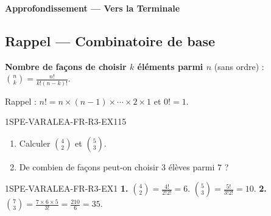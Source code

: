 
\begin{center}\textbf{Approfondissement — Vers la Terminale}\end{center}

\subsection*{Rappel — Combinatoire de base}

\textbf{Nombre de façons de choisir $k$ éléments parmi $n$} (sans ordre) :
$\binom{n}{k} = \frac{n!}{k!(n-k)!}$.

Rappel : $n! = n \times (n-1) \times \cdots \times 2 \times 1$ et $0! = 1$.

\begin{exercice}{1SPE-VARALEA-FR-R3-EX1}{1}{5}
\begin{enumerate}
  \item Calculer $\binom{4}{2}$ et $\binom{5}{3}$.
  \item De combien de façons peut-on choisir $3$ élèves parmi $7$ ?
\end{enumerate}
\end{exercice}


\begin{corrige}{1SPE-VARALEA-FR-R3-EX1}
\textbf{1.} $\binom{4}{2} = \frac{4!}{2!2!} = 6$. $\binom{5}{3} = \frac{5!}{3!2!} = 10$.
\textbf{2.} $\binom{7}{3} = \frac{7 \times 6 \times 5}{3!} = \frac{210}{6} = 35$.
\end{corrige}
